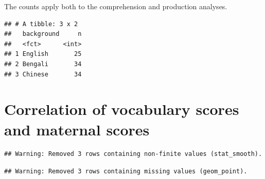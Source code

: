 \documentclass[]{article}
\newenvironment{Shaded}{\begin{snugshade}}{\end{snugshade}}
\newcommand{\DataTypeTok}[1]{\textcolor[rgb]{0.13,0.29,0.53}{#1}}
\newcommand{\KeywordTok}[1]{\textcolor[rgb]{0.13,0.29,0.53}{\textbf{#1}}}
\newcommand{\NormalTok}[1]{#1}
\newcommand{\OperatorTok}[1]{\textcolor[rgb]{0.81,0.36,0.00}{\textbf{#1}}}
\newcommand{\StringTok}[1]{\textcolor[rgb]{0.31,0.60,0.02}{#1}}
\begin{document}
The counts apply both to the comprehension and production analyses.

\begin{Shaded}
\end{Shaded}

\begin{verbatim}
## # A tibble: 3 x 2
##   background     n
##   <fct>      <int>
## 1 English       25
## 2 Bengali       34
## 3 Chinese       34
\end{verbatim}

\hypertarget{correlation-of-vocabulary-scores-and-maternal-scores}{%
\section{Correlation of vocabulary scores and maternal
scores}\label{correlation-of-vocabulary-scores-and-maternal-scores}}

\begin{Shaded}
\end{Shaded}

\begin{verbatim}
## Warning: Removed 3 rows containing non-finite values (stat_smooth).
\end{verbatim}

\begin{verbatim}
## Warning: Removed 3 rows containing missing values (geom_point).
\end{verbatim}
\end{document}
